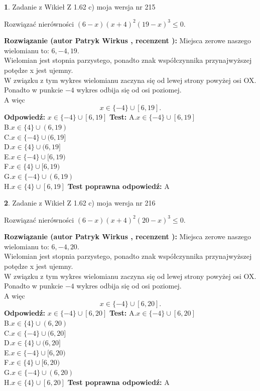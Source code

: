 \documentclass[12pt, a4paper]{article}
\theoremstyle{definition} %
\newtheorem{zad}{}
\newcommand{\zadStart}[1]{\begin{zad}#1\newline}
\newcommand{\zadStop}{\end{zad}}
\newcommand{\rozwStart}[2]{\noindent \textbf{Rozwiązanie (autor #1 , recenzent #2): }\newline}
\newcommand{\rozwStop}{\newline}
\newcommand{\odpStart}{\noindent \textbf{Odpowiedź:}\newline}
\newcommand{\odpStop}{\newline}
\newcommand{\testStart}{\noindent \textbf{Test:}\newline}
\newcommand{\testStop}{\newline}
\newcommand{\kluczStart}{\noindent \textbf{Test poprawna odpowiedź:}\newline}
\newcommand{\kluczStop}{\newline}
\begin{document}
\zadStart{Zadanie z Wikieł Z 1.62 c) moja wersja nr 215}

Rozwiązać nierówności $(6-x)(x+4)^{2}(19-x)^{3}\le0$.
\zadStop
\rozwStart{Patryk Wirkus}{}
Miejsca zerowe naszego wielomianu to: $6, -4, 19$.\\
Wielomian jest stopnia parzystego, ponadto znak współczynnika przy\linebreak najwyższej potędze x jest ujemny.\\ W związku z tym wykres wielomianu zaczyna się od lewej strony powyżej osi OX.\\
Ponadto w punkcie $-4$ wykres odbija się od osi poziomej.\\
A więc $$x \in \{-4\} \cup [6,19].$$
\rozwStop
\odpStart
$x \in \{-4\} \cup [6,19]$
\odpStop
\testStart
A.$x \in \{-4\} \cup [6,19]$\\
B.$x \in \{4\} \cup (6,19)$\\
C.$x \in \{-4\} \cup (6,19]$\\
D.$x \in \{4\} \cup (6,19]$\\
E.$x \in \{-4\} \cup [6,19)$\\
F.$x \in \{4\} \cup [6,19)$\\
G.$x \in \{-4\} \cup (6,19)$\\
H.$x \in \{4\} \cup [6,19]$
\testStop
\kluczStart
A
\kluczStop



\zadStart{Zadanie z Wikieł Z 1.62 c) moja wersja nr 216}

Rozwiązać nierówności $(6-x)(x+4)^{2}(20-x)^{3}\le0$.
\zadStop
\rozwStart{Patryk Wirkus}{}
Miejsca zerowe naszego wielomianu to: $6, -4, 20$.\\
Wielomian jest stopnia parzystego, ponadto znak współczynnika przy\linebreak najwyższej potędze x jest ujemny.\\ W związku z tym wykres wielomianu zaczyna się od lewej strony powyżej osi OX.\\
Ponadto w punkcie $-4$ wykres odbija się od osi poziomej.\\
A więc $$x \in \{-4\} \cup [6,20].$$
\rozwStop
\odpStart
$x \in \{-4\} \cup [6,20]$
\odpStop
\testStart
A.$x \in \{-4\} \cup [6,20]$\\
B.$x \in \{4\} \cup (6,20)$\\
C.$x \in \{-4\} \cup (6,20]$\\
D.$x \in \{4\} \cup (6,20]$\\
E.$x \in \{-4\} \cup [6,20)$\\
F.$x \in \{4\} \cup [6,20)$\\
G.$x \in \{-4\} \cup (6,20)$\\
H.$x \in \{4\} \cup [6,20]$
\testStop
\kluczStart
A
\kluczStop
\end{document}
